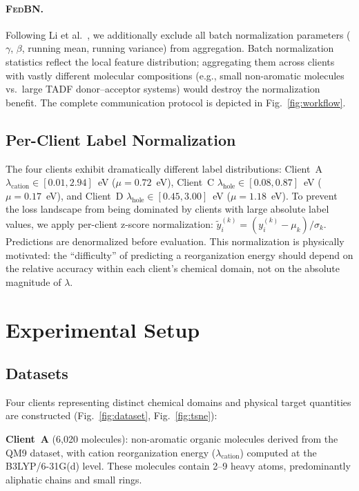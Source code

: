 \documentclass[twocolumn]{article}
\newcommand{\lam}{\lambda}
\newcommand{\lamhole}{\lambda_{\text{hole}}}
\newcommand{\lamcat}{\lambda_{\text{cation}}}
\newcommand{\FedBN}{\textsc{FedBN}}
\begin{document}
\paragraph{\FedBN{}.}
Following Li et al.~\cite{Li2021_FedBN}, we additionally exclude all batch normalization parameters ($\gamma$, $\beta$, running mean, running variance) from aggregation.
Batch normalization statistics reflect the local feature distribution; aggregating them across clients with vastly different molecular compositions (e.g., small non-aromatic molecules vs.\ large TADF donor--acceptor systems) would destroy the normalization benefit.
The complete communication protocol is depicted in Fig.~\ref{fig:workflow}.

\subsection{Per-Client Label Normalization}\label{sec:labelnorm}

The four clients exhibit dramatically different label distributions: Client~A $\lamcat \in [0.01, 2.94]$~eV ($\mu = 0.72$~eV), Client~C $\lamhole \in [0.08, 0.87]$~eV ($\mu = 0.17$~eV), and Client~D $\lamhole \in [0.45, 3.00]$~eV ($\mu = 1.18$~eV).
To prevent the loss landscape from being dominated by clients with large absolute label values, we apply per-client z-score normalization: $\tilde{y}_i^{(k)} = (y_i^{(k)} - \mu_k) / \sigma_k$.
Predictions are denormalized before evaluation.
This normalization is physically motivated: the ``difficulty'' of predicting a reorganization energy should depend on the relative accuracy within each client's chemical domain, not on the absolute magnitude of $\lam$.


\section{Experimental Setup}\label{sec:setup}

\subsection{Datasets}\label{sec:datasets}

Four clients representing distinct chemical domains and physical target quantities are constructed (Fig.~\ref{fig:dataset}, Fig.~\ref{fig:tsne}):

\textbf{Client~A} (6{,}020 molecules): non-aromatic organic molecules derived from the QM9 dataset, with cation reorganization energy ($\lamcat$) computed at the B3LYP/6-31G(d) level.
These molecules contain 2--9 heavy atoms, predominantly aliphatic chains and small rings.
\end{document}
